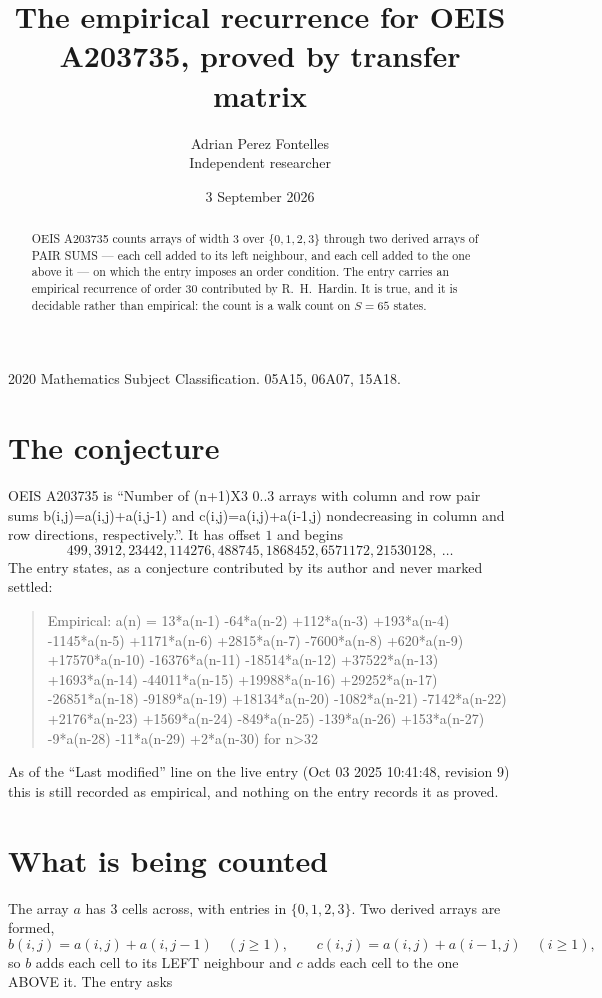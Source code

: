 \documentclass[11pt,a4paper]{article}
\title{The empirical recurrence for OEIS A203735, proved by transfer matrix}
\author{Adrian Perez Fontelles\\ \small Independent researcher}
\date{3 September 2026}
\theoremstyle{plain}
\theoremstyle{definition}
\begin{document}
\maketitle

\begin{abstract}
OEIS A203735 counts arrays of width $3$ over $\{0,1,2,3\}$ through two derived arrays of PAIR SUMS ---
each cell added to its left neighbour, and each cell added to the one above it --- on which the
entry imposes an order condition. The entry carries an empirical recurrence of order $30$
contributed by R.~H.~Hardin. It is true, and it is decidable rather than empirical: the count is
a walk count on $S=65$ states.
\end{abstract}

\noindent\small 2020 Mathematics Subject Classification. 05A15, 06A07, 15A18.\normalsize

\section{The conjecture}

OEIS A203735 is ``Number of (n+1)X3 0..3 arrays with column and row pair sums b(i,j)=a(i,j)+a(i,j-1) and c(i,j)=a(i,j)+a(i-1,j) nondecreasing in column and row directions, respectively.''. It has offset $1$ and begins
\[
499, 3912, 23442, 114276, 488745, 1868452, 6571172, 21530128,\ \dots
\]
The entry states, as a conjecture contributed by its author and never marked settled:
\begin{quote}
Empirical: a(n) = 13*a(n-1) -64*a(n-2) +112*a(n-3) +193*a(n-4) -1145*a(n-5) +1171*a(n-6) +2815*a(n-7) -7600*a(n-8) +620*a(n-9) +17570*a(n-10) -16376*a(n-11) -18514*a(n-12) +37522*a(n-13) +1693*a(n-14) -44011*a(n-15) +19988*a(n-16) +29252*a(n-17) -26851*a(n-18) -9189*a(n-19) +18134*a(n-20) -1082*a(n-21) -7142*a(n-22) +2176*a(n-23) +1569*a(n-24) -849*a(n-25) -139*a(n-26) +153*a(n-27) -9*a(n-28) -11*a(n-29) +2*a(n-30) for n>32
\end{quote}
As of the ``Last modified'' line on the live entry (Oct 03 2025 10:41:48, revision 9) this is still
recorded as empirical, and nothing on the entry records it as proved.

\section{What is being counted}

The array $a$ has $3$ cells across, with entries in $\{0,1,2,3\}$. Two derived arrays are formed,
\[
b(i,j)=a(i,j)+a(i,j-1)\quad(j\ge1),\qquad c(i,j)=a(i,j)+a(i-1,j)\quad(i\ge1),
\]
so $b$ adds each cell to its LEFT neighbour and $c$ adds each cell to the one ABOVE it. The
entry asks
\end{document}
